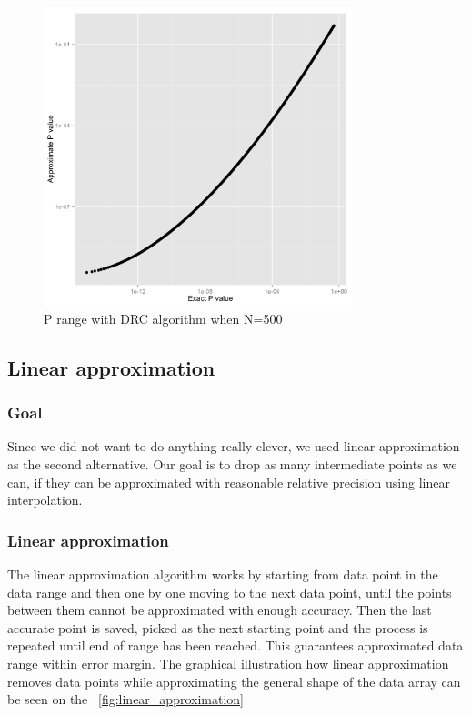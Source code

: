 \documentclass[12pt]{article}
\begin{document}
{\begin{figure}[H]
  \centering
  \includegraphics[width=0.8\textwidth]{PvsP50}
  \caption{P range with DRC algorithm when N=500}
  \label{fig:PdivPapproxDrcWhenN500}
\end{figure}

\subsection{Linear approximation}

\subsubsection{Goal}

Since we did not want to do anything really clever, we used linear approximation as the second alternative. Our goal is to drop as many intermediate points as we can, if they can be approximated with reasonable relative precision using linear interpolation.

\subsubsection{Linear approximation}
The linear approximation algorithm works by starting from data point in the data range and then one by one moving to the next data point, until the points between them cannot be approximated with enough accuracy. Then the last accurate point is saved, picked as the next starting point and the process is repeated until end of range has been reached. This guarantees approximated data range within error margin. The graphical illustration how linear approximation removes data points while approximating the general shape of the data array can be seen on the ~\ref{fig:linear_approximation}

}
\end{document}
